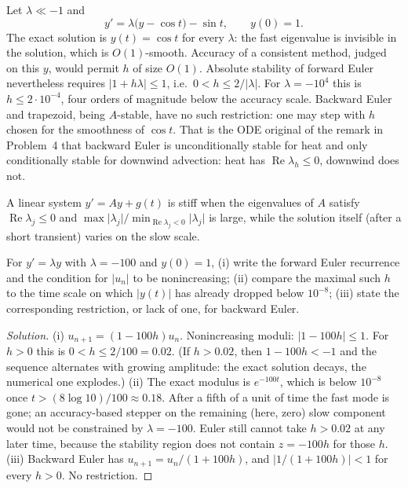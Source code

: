 \documentclass[11pt,a4paper]{article}
\begin{document}
\begin{example}
\label{ex:stiff-proto}
Let \(\lambda\ll -1\) and
\[
y'=\lambda\bigl(y-\cos t\bigr)-\sin t,
\qquad
y(0)=1.
\]
The exact solution is \(y(t)=\cos t\) for every \(\lambda\): the fast eigenvalue is invisible in the solution, which is \(O(1)\)-smooth. Accuracy of a consistent method, judged on this \(y\), would permit \(h\) of size \(O(1)\). Absolute stability of forward Euler nevertheless requires \(\lvert 1+h\lambda\rvert\le 1\), i.e.\ \(0<h\le 2/\lvert\lambda\rvert\). For \(\lambda=-10^{4}\) this is \(h\le 2\cdot 10^{-4}\), four orders of magnitude below the accuracy scale. Backward Euler and trapezoid, being \(A\)-stable, have no such restriction: one may step with \(h\) chosen for the smoothness of \(\cos t\). That is the ODE original of the remark in Problem~4 that backward Euler is unconditionally stable for heat and only conditionally stable for downwind advection: heat has \(\operatorname{Re}\lambda_{h}\le 0\), downwind does not.

A linear system \(y'=Ay+g(t)\) is stiff when the eigenvalues of \(A\) satisfy \(\operatorname{Re}\lambda_{j}\le 0\) and \(\max\lvert\lambda_{j}\rvert/\min_{\operatorname{Re}\lambda_{j}<0}\lvert\lambda_{j}\rvert\) is large, while the solution itself (after a short transient) varies on the slow scale.
\end{example}

\begin{exercise}
\label{exer:fe-stiff}
For \(y'=\lambda y\) with \(\lambda=-100\) and \(y(0)=1\), (i) write the forward Euler recurrence and the condition for \(\lvert u_{n}\rvert\) to be nonincreasing; (ii) compare the maximal such \(h\) to the time scale on which \(\lvert y(t)\rvert\) has already dropped below \(10^{-8}\); (iii) state the corresponding restriction, or lack of one, for backward Euler.
\end{exercise}

\begin{proof}[Solution]
(i) \(u_{n+1}=(1-100h)u_{n}\). Nonincreasing moduli: \(\lvert 1-100h\rvert\le 1\). For \(h>0\) this is \(0<h\le 2/100=0.02\). (If \(h>0.02\), then \(1-100h<-1\) and the sequence alternates with growing amplitude: the exact solution decays, the numerical one explodes.) (ii) The exact modulus is \(e^{-100t}\), which is below \(10^{-8}\) once \(t>(8\log 10)/100\approx 0.18\). After a fifth of a unit of time the fast mode is gone; an accuracy-based stepper on the remaining (here, zero) slow component would not be constrained by \(\lambda=-100\). Euler still cannot take \(h>0.02\) at any later time, because the stability region does not contain \(z=-100h\) for those \(h\). (iii) Backward Euler has \(u_{n+1}=u_{n}/(1+100h)\), and \(\lvert 1/(1+100h)\rvert<1\) for every \(h>0\). No restriction.
\end{proof}
\end{document}
